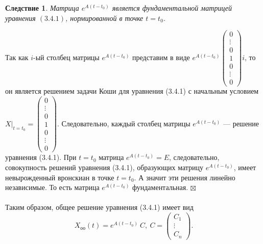 \documentclass[a4paper, 12pt]{report}
\newenvironment{Proof} %
{\par\noindent{$\blacklozenge$}} %
{\hfill$\scriptstyle\boxtimes$}
\newtheorem*{cor}{Следствие}
\begin{document}
\begin{cor}
	Матрица $e^{A(t-t_0)}$ является фундаментальной матрицей уравнения $(3.4.1)$, нормированной в точке $t =t_0$.
\end{cor}\begin{Proof}
Так как $i$-ый столбец матрицы $e^{A(t-t_0)}$ представим в виде $e^{A(t-t_0)}\begin{pmatrix}
	0\\\vdots\\0\\1\\0\\\vdots\\0
\end{pmatrix}i$, то он является решением задачи Коши для уравнения (3.4.1) с начальным условием $X|_{t=t_0} = \begin{pmatrix}
0\\\vdots\\0\\1\\0\\\vdots\\0
\end{pmatrix}$. Следовательно, каждый столбец матрицы $e^{A(t-t_0)}$ --- решение уравнения (3.4.1). При $t=t_0$ матрица $e^{A(t-t_0)} = E$, следовательно, совокупность решений уравнения (3.4.1), образующих матрицу $e^{A(t-t_0)}$, имеет невырожденный вронскиан в точке $t=t_0$. А значит эти решения линейно независимые. То есть матрица $e^{A(t-t_0)}$ фундаментальная. 
\end{Proof}\\\\
Таким образом, общее решение уравнения (3.4.1) имеет вид $$X_\text{оо}(t) = e^{A(t-t_0)}\ C,\ C = \begin{pmatrix}
	C_1\\\vdots\\C_n
\end{pmatrix}.$$
\end{document}
